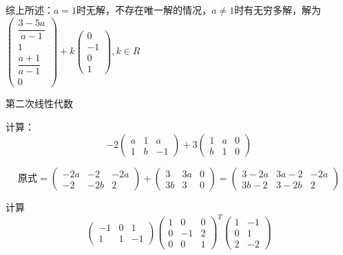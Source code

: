 \documentclass[a4paper]{report}
\begin{document}
\begin{jie}
综上所述：$a=1$时无解，不存在唯一解的情况，$a\neq 1$时有无穷多解，解为$\begin{pmatrix}
\dfrac{3-5a}{a-1}\\[2pt]
1\\
\dfrac{a+1}{a-1}\\[2pt]
0
\end{pmatrix}+k
\begin{pmatrix}
0\\
-1\\
0\\
1
\end{pmatrix},k\in R$
\end{jie}

\clearpage

\hphantom{~~}\hfill {\heiti 第二次线性代数} \hfill\hphantom{~~}


\hphantom{~~}

\EX 计算：
\begin{equation*}
-2
\begin{pmatrix}
a&1&a\\ 1&b&-1
\end{pmatrix}+3
\begin{pmatrix}
1&a&0\\ b&1&0
\end{pmatrix}
\end{equation*}

\begin{jie}
\begin{equation*}
\text{原式}=\begin{pmatrix}
-2a&-2&-2a\\ -2&-2b&2
\end{pmatrix}+\begin{pmatrix}
3&3a&0\\ 3b&3&0
\end{pmatrix}=\begin{pmatrix}
3-2a&3a-2&-2a\\ 3b-2&3-2b&2
\end{pmatrix}
\end{equation*}
\end{jie}

\EX 计算
\begin{equation*}
\begin{pmatrix}
-1&0&1\\ 1&1&-1
\end{pmatrix}\begin{pmatrix}
1&0&0\\ 0&-1&2\\ 0&0&1
\end{pmatrix}^{T}\begin{pmatrix}
1&-1\\ 0&1\\ 2&-2
\end{pmatrix}
\end{equation*}
\end{document}
